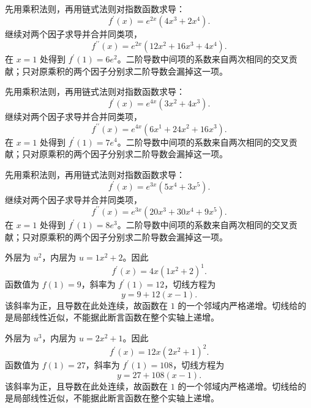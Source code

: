 \documentclass[UTF8,12pt,a4paper,fontset=fandol]{ctexart}
\begin{document}
\begin{solve}\label{ans:c8q4}
先用乘积法则，再用链式法则对指数函数求导：
\[
f^{\prime}(x)=e^{2x}(4x^{3}+2x^{4}).
\]
继续对两个因子求导并合并同类项，
\[
f^{\prime\prime}(x)=e^{2x}\left(12x^{2}+16x^{3}+4x^{4}\right).
\]
在 $x=1$ 处得到 $f^{\prime}(1)=6e^{2}$。二阶导数中间项的系数来自两次相同的交叉贡献；只对原乘积的两个因子分别求二阶导数会漏掉这一项。
\end{solve}

\begin{solve}\label{ans:c8q5}
先用乘积法则，再用链式法则对指数函数求导：
\[
f^{\prime}(x)=e^{4x}(3x^{2}+4x^{3}).
\]
继续对两个因子求导并合并同类项，
\[
f^{\prime\prime}(x)=e^{4x}\left(6x^{1}+24x^{2}+16x^{3}\right).
\]
在 $x=1$ 处得到 $f^{\prime}(1)=7e^{4}$。二阶导数中间项的系数来自两次相同的交叉贡献；只对原乘积的两个因子分别求二阶导数会漏掉这一项。
\end{solve}

\begin{solve}\label{ans:c8q6}
先用乘积法则，再用链式法则对指数函数求导：
\[
f^{\prime}(x)=e^{3x}(5x^{4}+3x^{5}).
\]
继续对两个因子求导并合并同类项，
\[
f^{\prime\prime}(x)=e^{3x}\left(20x^{3}+30x^{4}+9x^{5}\right).
\]
在 $x=1$ 处得到 $f^{\prime}(1)=8e^{3}$。二阶导数中间项的系数来自两次相同的交叉贡献；只对原乘积的两个因子分别求二阶导数会漏掉这一项。
\end{solve}

\begin{solve}\label{ans:c8q7}
外层为 $u^{2}$，内层为 $u=1x^2+2$。因此
\[
f^{\prime}(x)=4x(1x^2+2)^{1}.
\]
函数值为 $f(1)=9$，斜率为 $f^{\prime}(1)=12$，切线方程为
\[
y=9+12(x-1).
\]
该斜率为正，且导数在此处连续，故函数在 $1$ 的一个邻域内严格递增。切线给的是局部线性近似，不能据此断言函数在整个实轴上递增。
\end{solve}

\begin{solve}\label{ans:c8q8}
外层为 $u^{3}$，内层为 $u=2x^2+1$。因此
\[
f^{\prime}(x)=12x(2x^2+1)^{2}.
\]
函数值为 $f(1)=27$，斜率为 $f^{\prime}(1)=108$，切线方程为
\[
y=27+108(x-1).
\]
该斜率为正，且导数在此处连续，故函数在 $1$ 的一个邻域内严格递增。切线给的是局部线性近似，不能据此断言函数在整个实轴上递增。
\end{solve}
\end{document}
